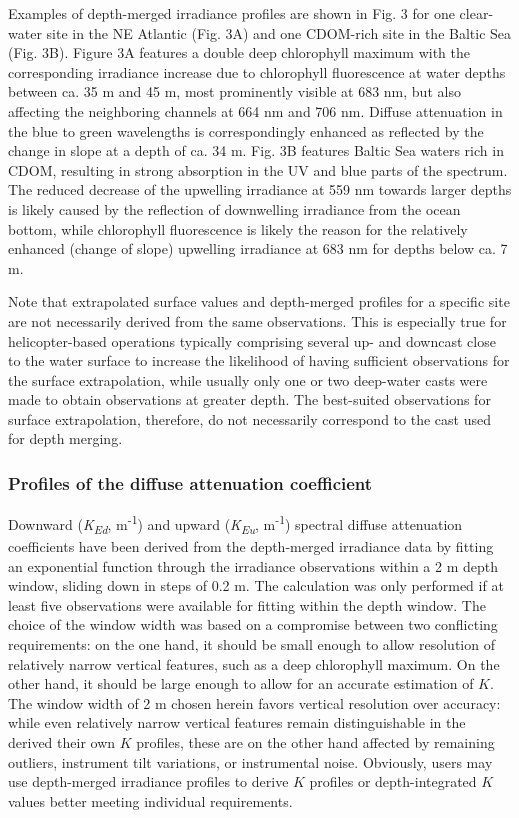 \documentclass[essd, manuscript]{copernicus}
\begin{document}
Examples of depth-merged irradiance profiles are shown in Fig. 3 for one clear-water site in the NE Atlantic (Fig. 3A) and one CDOM-rich site in the Baltic Sea (Fig. 3B). Figure 3A features a double deep chlorophyll maximum with the corresponding irradiance increase due to chlorophyll fluorescence at water depths between ca. 35 m and 45 m, most prominently visible at 683 nm, but also affecting the neighboring channels at 664 nm and 706 nm. Diffuse attenuation in the blue to green wavelengths is correspondingly enhanced as reflected by the change in slope at a depth of ca. 34 m. Fig. 3B features Baltic Sea waters rich in CDOM, resulting in strong absorption in the UV and blue parts of the spectrum. The reduced decrease of the upwelling irradiance at 559 nm towards larger depths is likely caused by the reflection of downwelling irradiance from the ocean bottom, while chlorophyll fluorescence is likely the reason for the relatively enhanced (change of slope) upwelling irradiance at 683 nm for depths below ca. 7 m.

Note that extrapolated surface values and depth-merged profiles for a specific site are not necessarily derived from the same observations. This is especially true for helicopter-based operations typically comprising several up- and downcast close to the water surface to increase the likelihood of having sufficient observations for the surface extrapolation, while usually only one or two deep-water casts were made to obtain observations at greater depth. The best-suited observations for surface extrapolation, therefore, do not necessarily correspond to the cast used for depth merging.

\subsubsection{Profiles of the diffuse attenuation coefficient}

Downward (\textit{K\textsubscript{Ed}}, m\textsuperscript{-1}) and upward (\textit{K\textsubscript{Eu}}, m\textsuperscript{-1}) spectral diffuse attenuation coefficients have been derived from the depth-merged irradiance data by fitting an exponential function through the irradiance observations within a 2 m depth window, sliding down in steps of 0.2 m. The calculation was only performed if at least five observations were available for fitting within the depth window. The choice of the window width was based on a compromise between two conflicting requirements: on the one hand, it should be small enough to allow resolution of relatively narrow vertical features, such as a deep chlorophyll maximum. On the other hand, it should be large enough to allow for an accurate estimation of $K$. The window width of 2 m chosen herein favors vertical resolution over accuracy: while even relatively narrow vertical features remain distinguishable in the derived their own $K$ profiles, these are on the other hand affected by remaining outliers, instrument tilt variations, or instrumental noise. Obviously, users may use depth-merged irradiance profiles to derive $K$ profiles or depth-integrated $K$ values better meeting individual requirements.
\end{document}
